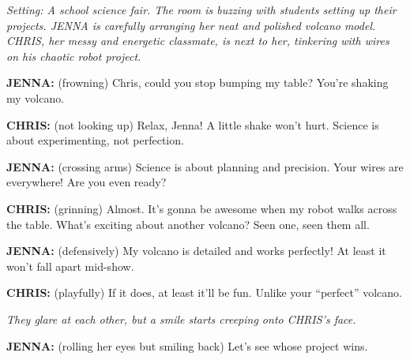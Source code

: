 \documentclass[12pt]{article}
\begin{document}
\begin{tcolorbox}[colframe=black!60, colback=white, 
coltitle=black, colbacktitle=black!15, fonttitle=\bfseries\Large, 
title=Text: The Science Fair Showdown, halign title=center, left=10pt, right=10pt, top=10pt, bottom=15pt]


\textit{Setting: A school science fair. The room is buzzing with students setting up their projects. JENNA is carefully arranging her neat and polished volcano model. CHRIS, her messy and energetic classmate, is next to her, tinkering with wires on his chaotic robot project.}

\textbf{JENNA:} (frowning) Chris, could you stop bumping my table? You’re shaking my volcano.

\textbf{CHRIS:} (not looking up) Relax, Jenna! A little shake won’t hurt. Science is about experimenting, not perfection.

\textbf{JENNA:} (crossing arms) Science is about planning and precision. Your wires are everywhere! Are you even ready?

\textbf{CHRIS:} (grinning) Almost. It’s gonna be awesome when my robot walks across the table. What’s exciting about another volcano? Seen one, seen them all.

\textbf{JENNA:} (defensively) My volcano is detailed and works perfectly! At least it won’t fall apart mid-show.

\textbf{CHRIS:} (playfully) If it does, at least it’ll be fun. Unlike your “perfect” volcano.

\textit{They glare at each other, but a smile starts creeping onto CHRIS’s face.}

\textbf{JENNA:} (rolling her eyes but smiling back) Let’s see whose project wins.

 

 

\end{tcolorbox}

\vspace{1em}
\end{document}
